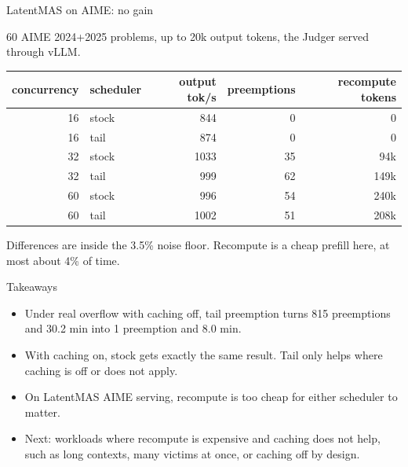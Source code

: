 \documentclass[aspectratio=169]{beamer}
\begin{document}
\begin{frame}{LatentMAS on AIME: no gain}

60 AIME 2024+2025 problems, up to 20k output tokens, the Judger served through vLLM.

\begin{center}
\begin{tabular}{rlrrr}
\toprule
concurrency & scheduler & output tok/s & preemptions & recompute tokens \\
\midrule
16 & stock & 844 & 0 & 0 \\
16 & tail & 874 & 0 & 0 \\
32 & stock & 1033 & 35 & 94k \\
32 & tail & 999 & 62 & 149k \\
60 & stock & 996 & 54 & 240k \\
60 & tail & 1002 & 51 & 208k \\
\bottomrule
\end{tabular}
\end{center}

Differences are inside the 3.5\% noise floor. Recompute is a cheap prefill here, at most about 4\% of time.

\end{frame}

\begin{frame}{Takeaways}

\begin{itemize}
  \item Under real overflow with caching off, tail preemption turns 815 preemptions and 30.2 min into 1 preemption and 8.0 min.
  \item With caching on, stock gets exactly the same result. Tail only helps where caching is off or does not apply.
  \item On LatentMAS AIME serving, recompute is too cheap for either scheduler to matter.
  \item Next: workloads where recompute is expensive and caching does not help,
    such as long contexts, many victims at once, or caching off by design.
\end{itemize}

\end{frame}
\end{document}

